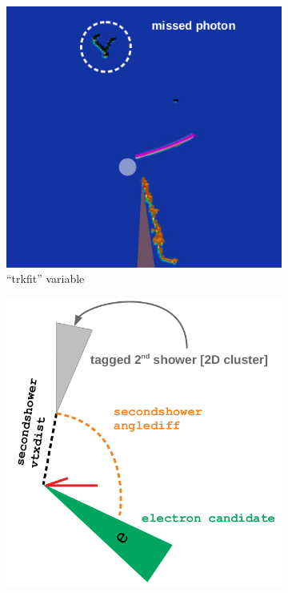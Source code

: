 \begin{figure}[H] 
\begin{center}
    \begin{subfigure}[b]{0.35\textwidth}
    \centering
    \includegraphics[width=1.00\textwidth]{nueselection/variables/secondshowerevd.png}
    \caption{\label{fig:nue:variables:secondshowerevd} ``trkfit'' variable }
    \end{subfigure}
    \begin{subfigure}[b]{0.35\textwidth}
    \centering
    \includegraphics[width=1.00\textwidth]{nueselection/variables/secondshower.png}

\end{subfigure}
\end{center}
\end{figure}
